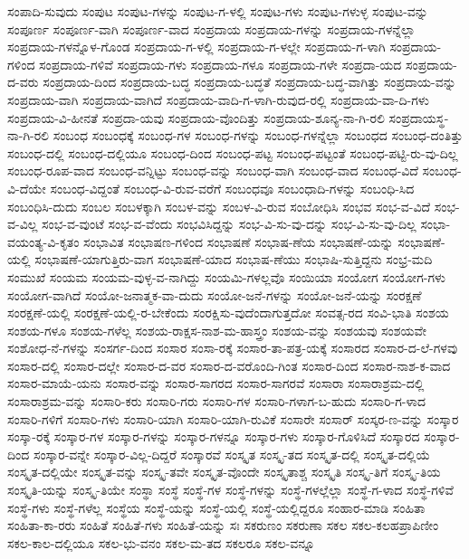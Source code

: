 ಸಂಪಾದಿ-ಸುವುದು
ಸಂಪುಟ
ಸಂಪುಟ-ಗಳನ್ನು
ಸಂಪುಟ-ಗ-ಳಲ್ಲಿ
ಸಂಪುಟ-ಗಳು
ಸಂಪುಟ-ಗಳುಳ್ಳ
ಸಂಪುಟ-ವನ್ನು
ಸಂಪೂರ್ಣ
ಸಂಪೂರ್ಣ-ವಾಗಿ
ಸಂಪೂರ್ಣ-ವಾದ
ಸಂಪ್ರದಾಯ
ಸಂಪ್ರದಾಯ-ಗಳನ್ನು
ಸಂಪ್ರದಾಯ-ಗಳನ್ನೆಲ್ಲಾ
ಸಂಪ್ರದಾಯ-ಗಳನ್ನೊಳ-ಗೊಂಡ
ಸಂಪ್ರದಾಯ-ಗ-ಳಲ್ಲಿ
ಸಂಪ್ರದಾಯ-ಗ-ಳಲ್ಲೇ
ಸಂಪ್ರದಾಯ-ಗ-ಳಾಗಿ
ಸಂಪ್ರದಾಯ-ಗಳಿಂದ
ಸಂಪ್ರದಾಯ-ಗಳಿವೆ
ಸಂಪ್ರದಾಯ-ಗಳು
ಸಂಪ್ರದಾಯ-ಗಳೂ
ಸಂಪ್ರದಾಯ-ಗಳೇ
ಸಂಪ್ರದಾ-ಯದ
ಸಂಪ್ರದಾಯ-ದ-ವರು
ಸಂಪ್ರದಾಯ-ದಿಂದ
ಸಂಪ್ರದಾಯ-ಬದ್ಧ
ಸಂಪ್ರದಾಯ-ಬದ್ಧತೆ
ಸಂಪ್ರದಾಯ-ಬದ್ಧ-ವಾಗಿತ್ತು
ಸಂಪ್ರದಾಯ-ವನ್ನು
ಸಂಪ್ರದಾಯ-ವಾಗಿ
ಸಂಪ್ರದಾಯ-ವಾಗಿದೆ
ಸಂಪ್ರದಾಯ-ವಾದಿ-ಗ-ಳಾಗಿ-ರುವುದ-ರಲ್ಲಿ
ಸಂಪ್ರದಾಯ-ವಾ-ದಿ-ಗಳು
ಸಂಪ್ರದಾಯ-ವಿ-ಹೀನತೆ
ಸಂಪ್ರದಾ-ಯವು
ಸಂಪ್ರದಾಯ-ವೊಂದಿತ್ತು
ಸಂಪ್ರದಾಯ-ಶೂನ್ಯ-ನಾ-ಗಿ-ರಲಿ
ಸಂಪ್ರದಾಯಸ್ಥ-ನಾ-ಗಿ-ರಲಿ
ಸಂಬಂಧ
ಸಂಬಂಧಕ್ಕೆ
ಸಂಬಂಧ-ಗಳ
ಸಂಬಂಧ-ಗಳನ್ನು
ಸಂಬಂಧ-ಗಳನ್ನೆಲ್ಲಾ
ಸಂಬಂಧದ
ಸಂಬಂಧ-ದಂತಿತ್ತು
ಸಂಬಂಧ-ದಲ್ಲಿ
ಸಂಬಂಧ-ದಲ್ಲಿಯೂ
ಸಂಬಂಧ-ದಿಂದ
ಸಂಬಂಧ-ಪಟ್ಟ
ಸಂಬಂಧ-ಪಟ್ಟಂತೆ
ಸಂಬಂಧ-ಪಟ್ಟಿ-ರು-ವು-ದಿಲ್ಲ
ಸಂಬಂಧ-ರೂಪ-ವಾದ
ಸಂಬಂಧ-ವನ್ನಿಟ್ಟು
ಸಂಬಂಧ-ವನ್ನು
ಸಂಬಂಧ-ವಾಗಿ
ಸಂಬಂಧ-ವಾದ
ಸಂಬಂಧ-ವಿದೆ
ಸಂಬಂಧ-ವಿ-ದೆಯೇ
ಸಂಬಂಧ-ವಿದ್ದಂತೆ
ಸಂಬಂಧ-ವಿ-ರುವ-ವರೆಗೆ
ಸಂಬಂಧವೂ
ಸಂಬಂಧಾದಿ-ಗಳನ್ನು
ಸಂಬಂಧಿ-ಸಿದ
ಸಂಬಂಧಿಸಿ-ದುದು
ಸಂಬಲ
ಸಂಬಳಕ್ಕಾಗಿ
ಸಂಬಳ-ವನ್ನು
ಸಂಬಳ-ವಿ-ರುವ
ಸಂಬೋಧಿಸಿ
ಸಂಭವ
ಸಂಭ-ವ-ವಿದೆ
ಸಂಭ-ವ-ವಿಲ್ಲ
ಸಂಭ-ವ-ವುಂಟೆ
ಸಂಭ-ವ-ವೆಂದು
ಸಂಭವಿಸಿದ್ದನ್ನು
ಸಂಭ-ವಿ-ಸು-ವು-ದನ್ನು
ಸಂಭ-ವಿ-ಸು-ವು-ದಿಲ್ಲ
ಸಂಭಾ-ವಯಂತ್ಯ-ವಿ-ಕೃತಂ
ಸಂಭಾವಿತ
ಸಂಭಾಷಣ-ಗಳಿಂದ
ಸಂಭಾಷಣೆ
ಸಂಭಾಷ-ಣೆಯ
ಸಂಭಾಷಣೆ-ಯನ್ನು
ಸಂಭಾಷಣೆ-ಯಲ್ಲಿ
ಸಂಭಾಷಣೆ-ಯಾಗುತ್ತಿರು-ವಾಗ
ಸಂಭಾಷಣೆ-ಯಾದ
ಸಂಭಾಷ-ಣೆಯು
ಸಂಭಾಷಿ-ಸುತ್ತಿದ್ದನು
ಸಂಭ್ರ-ಮದಿ
ಸಂಮುಖೆ
ಸಂಯಮ
ಸಂಯಮ-ವುಳ್ಳ-ವ-ನಾಗಿದ್ದು
ಸಂಯಮಿ-ಗಳಲ್ಲವೊ
ಸಂಯಿಯಾ
ಸಂಯೋಗ
ಸಂಯೋಗ-ಗಳು
ಸಂಯೋಗ-ವಾಗಿದೆ
ಸಂಯೋ-ಜನಾತ್ಮಕ-ವಾ-ದುದು
ಸಂಯೋ-ಜನೆ-ಗಳನ್ನು
ಸಂಯೋ-ಜನೆ-ಯನ್ನು
ಸಂರಕ್ಷಣೆ
ಸಂರಕ್ಷಣೆ-ಯಲ್ಲಿ
ಸಂರಕ್ಷಣೆ-ಯಲ್ಲಿ-ರ-ಬೇಕೆಂದು
ಸಂರಕ್ಷಿಸು-ವುದೆಂದಾಗುತ್ತದೋ
ಸಂವತ್ಸ-ರದ
ಸಂವಿ-ಭಾತಿ
ಸಂಶಯ
ಸಂಶಯ-ಗಳೂ
ಸಂಶಯ-ಗಳೆಲ್ಲ
ಸಂಶಯ-ರಾಕ್ಷಸ-ನಾಶ-ಮ-ಹಾಸ್ತ್ರಂ
ಸಂಶಯ-ವನ್ನು
ಸಂಶಯವು
ಸಂಶಯವೇ
ಸಂಶೋಧ-ನೆ-ಗಳನ್ನು
ಸಂಸರ್ಗ-ದಿಂದ
ಸಂಸಾರ
ಸಂಸಾ-ರಕ್ಕೆ
ಸಂಸಾರ-ತಾ-ಪತ್ರ-ಯಕ್ಕೆ
ಸಂಸಾರದ
ಸಂಸಾರ-ದ-ಲೆ-ಗಳವು
ಸಂಸಾರ-ದಲ್ಲಿ
ಸಂಸಾರ-ದಲ್ಲೇ
ಸಂಸಾರ-ದ-ವರ
ಸಂಸಾರ-ದ-ವರೊಂದಿ-ಗಿಂತ
ಸಂಸಾರ-ದಿಂದ
ಸಂಸಾರ-ನಾಶ-ಕ-ವಾದ
ಸಂಸಾರ-ಮಾಯೆ-ಯನು
ಸಂಸಾರ-ವನ್ನು
ಸಂಸಾರ-ಸಾಗರದ
ಸಂಸಾರ-ಸಾಗರವೆ
ಸಂಸಾರಾ
ಸಂಸಾರಾಶ್ರಮ-ದಲ್ಲಿ
ಸಂಸಾರಾಶ್ರಮ-ವನ್ನು
ಸಂಸಾರಿ-ಕರು
ಸಂಸಾರಿ-ಗರು
ಸಂಸಾರಿ-ಗಳ
ಸಂಸಾರಿ-ಗಳಾಗ-ಬ-ಹುದು
ಸಂಸಾರಿ-ಗ-ಳಾದ
ಸಂಸಾರಿ-ಗಳಿಗೆ
ಸಂಸಾರಿ-ಗಳು
ಸಂಸಾರಿ-ಯಾಗಿ
ಸಂಸಾರಿ-ಯಾಗಿ-ರುವಿಕೆ
ಸಂಸಾರೇ
ಸಂಸಾರ್
ಸಂಸ್ಕರ-ಣ-ವನ್ನು
ಸಂಸ್ಕಾರ
ಸಂಸ್ಕಾ-ರಕ್ಕೆ
ಸಂಸ್ಕಾರ-ಗಳ
ಸಂಸ್ಕಾರ-ಗಳನ್ನು
ಸಂಸ್ಕಾರ-ಗಳನ್ನೂ
ಸಂಸ್ಕಾರ-ಗಳು
ಸಂಸ್ಕಾರ-ಗೊಳಿಸಿದೆ
ಸಂಸ್ಕಾರದ
ಸಂಸ್ಕಾರ-ದಿಂದ
ಸಂಸ್ಕಾರ-ವನ್ನೇ
ಸಂಸ್ಕಾರ-ವಿಲ್ಲ-ದಿದ್ದರೆ
ಸಂಸ್ಕಾರವೆ
ಸಂಸ್ಕೃತ
ಸಂಸ್ಕೃ-ತದ
ಸಂಸ್ಕೃತ-ದಲ್ಲಿ
ಸಂಸ್ಕೃತ-ದಲ್ಲಿಯೆ
ಸಂಸ್ಕೃತ-ದಲ್ಲಿಯೇ
ಸಂಸ್ಕೃತ-ವನ್ನು
ಸಂಸ್ಕೃ-ತವೇ
ಸಂಸ್ಕೃತ-ವೊಂದೇ
ಸಂಸ್ಕೃತಾಶ್ಚ
ಸಂಸ್ಕೃತಿ
ಸಂಸ್ಕೃ-ತಿಗೆ
ಸಂಸ್ಕೃ-ತಿಯ
ಸಂಸ್ಕೃತಿ-ಯನ್ನು
ಸಂಸ್ಕೃ-ತಿಯೇ
ಸಂಸ್ಥಾ
ಸಂಸ್ಥೆ
ಸಂಸ್ಥೆ-ಗಳ
ಸಂಸ್ಥೆ-ಗಳನ್ನು
ಸಂಸ್ಥೆ-ಗಳಲ್ಲೆಲ್ಲಾ
ಸಂಸ್ಥೆ-ಗ-ಳಾದ
ಸಂಸ್ಥೆ-ಗಳಿವೆ
ಸಂಸ್ಥೆ-ಗಳು
ಸಂಸ್ಥೆ-ಗಳೆಲ್ಲ
ಸಂಸ್ಥೆಯ
ಸಂಸ್ಥೆ-ಯನ್ನು
ಸಂಸ್ಥೆ-ಯಲ್ಲಿ
ಸಂಸ್ಥೆ-ಯಲ್ಲಿದ್ದರೂ
ಸಂಹಾರ-ಮಾಡಿ
ಸಂಹಿತಾ
ಸಂಹಿತಾ-ಕಾ-ರರು
ಸಂಹಿತೆ
ಸಂಹಿತೆ-ಗಳು
ಸಂಹಿತೆ-ಯನ್ನು
ಸಃ
ಸಕರುಣಂ
ಸಕರುಣಾ
ಸಕಲ
ಸಕಲ-ಕಲಹಪ್ರಾಪಿಣೀಂ
ಸಕಲ-ಕಾಲ-ದಲ್ಲಿಯೂ
ಸಕಲ-ಭು-ವನಂ
ಸಕಲ-ಮ-ತದ
ಸಕಲರೂ
ಸಕಲ-ವನ್ನೂ
